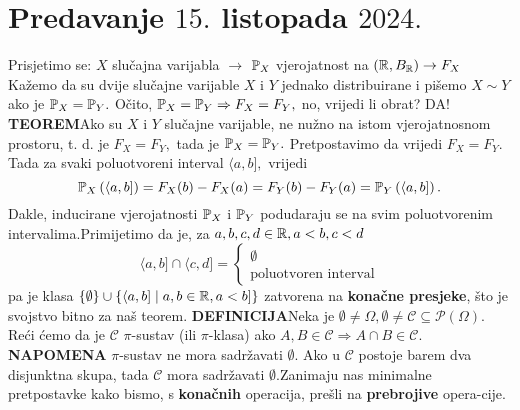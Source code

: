 \documentclass{article}
\begin{document}
\section{Predavanje \(15.\) listopada \(2024.\)}
Prisjetimo se: \(X\) slučajna varijabla \(\to\) \(\Bbb P_X\) vjerojatnost na \((\Bbb R,B_\Bbb R)\to F_X\)\newline
Kažemo da su dvije slučajne varijable \(X\) i \(Y\) jednako distribuirane i pišemo \(X\sim Y\) ako je \(\Bbb P_X=\Bbb P_Y.\) Očito, \(\Bbb P_X=\Bbb P_Y\Rightarrow F_X=F_Y,\) no, vrijedi li obrat? DA!\newline\newline
\textbf{TEOREM}\newline Ako su \(X\) i \(Y\) slučajne varijable, ne nužno na istom vjerojatnosnom prostoru, t. d. je \( F_X=F_Y,\) tada je \(\Bbb P_X=\Bbb P_Y.\)\newline\newline
Pretpostavimo da vrijedi \(F_X=F_Y.\) Tada za svaki poluotvoreni interval \(\langle a,b],\) vrijedi \[\Bbb P_X\left(\langle a,b]\right)=F_X(b)-F_X(a)=F_Y(b)-F_Y(a)=\Bbb P_Y\left(\langle a,b]\right).\] Dakle, inducirane vjerojatnosti \(\Bbb P_X\) i \(\Bbb P_Y\) podudaraju se na svim poluotvorenim intervalima.\newline Primijetimo da je, za \(a,b,c,d\in\Bbb R, a<b,c<d\) \[\langle a,b]\cap\langle c,d]=\begin{cases}\emptyset\\\text{poluotvoren interval}\end{cases}\] pa je klasa \(\{\emptyset\}\cup\left\{\langle a,b]\mid a,b\in\Bbb R, a<b]\right\}\) zatvorena na \textbf{konačne presjeke}, što je svojstvo bitno za naš teorem.\newline\newline
\textbf{DEFINICIJA}\newline Neka je \(\emptyset\ne\Omega,\emptyset\ne \mathcal C\subseteq\mathcal P(\Omega).\) Reći ćemo da je \(\mathcal C\) \(\pi\)-sustav (ili \(\pi\)-klasa) ako \(A,B\in\mathcal C\Rightarrow A\cap B\in\mathcal C.\)\newline\newline
{}\textbf{NAPOMENA}\newline
\(\pi\)-sustav ne mora sadržavati \(\emptyset.\) Ako u \(\mathcal C\) postoje barem dva disjunktna skupa, tada \(\mathcal C\) mora sadržavati \(\emptyset.\)\newline\newline Zanimaju nas minimalne pretpostavke kako bismo, s \textbf{konačnih} operacija, prešli na \textbf{prebrojive} opera-\newline cije.\newline\newline
\end{document}
